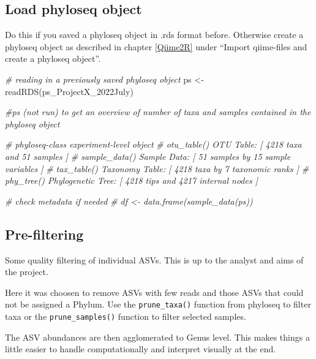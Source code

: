 \documentclass[
]{book}
\newenvironment{Shaded}{\begin{snugshade}}{\end{snugshade}}
\newcommand{\CommentTok}[1]{\textcolor[rgb]{0.56,0.35,0.01}{\textit{#1}}}
\newcommand{\FunctionTok}[1]{\textcolor[rgb]{0.00,0.00,0.00}{#1}}
\newcommand{\NormalTok}[1]{#1}
\newcommand{\OtherTok}[1]{\textcolor[rgb]{0.56,0.35,0.01}{#1}}
\newcommand{\StringTok}[1]{\textcolor[rgb]{0.31,0.60,0.02}{#1}}
\begin{document}
\hypertarget{load-phyloseq-object-2}{%
\subsection{Load phyloseq object}\label{load-phyloseq-object-2}}

Do this if you saved a phyloseq object in .rds format before. Otherwise create a phyloseq object as described in chapter \ref{Qiime2R} under ``Import qiime-files and create a phyloseq object''.

\begin{Shaded}
\begin{Highlighting}[]
\CommentTok{\# reading in a previously saved phyloseq object}
\NormalTok{ps }\OtherTok{\textless{}{-}} \FunctionTok{readRDS}\NormalTok{(}\StringTok{\textquotesingle{}ps\_ProjectX\_2022July\textquotesingle{}}\NormalTok{)}

\CommentTok{\#ps (not run) to get an overview of number of taxa and samples contained in the phyloseq object}

\CommentTok{\# phyloseq{-}class experiment{-}level object}
\CommentTok{\# otu\_table()   OTU Table:         [ 4218 taxa and 51 samples ]}
\CommentTok{\# sample\_data() Sample Data:       [ 51 samples by 15 sample variables ]}
\CommentTok{\# tax\_table()   Taxonomy Table:    [ 4218 taxa by 7 taxonomic ranks ]}
\CommentTok{\# phy\_tree()    Phylogenetic Tree: [ 4218 tips and 4217 internal nodes ]}

\CommentTok{\# check metadata if needed}
\CommentTok{\# df \textless{}{-} data.frame(sample\_data(ps))}
\end{Highlighting}
\end{Shaded}

\hypertarget{pre-filtering-1}{%
\subsection{Pre-filtering}\label{pre-filtering-1}}

Some quality filtering of individual ASVs. This is up to the analyst and aims of the project.

Here it was choosen to remove ASVs with few reads and those ASVs that could not be assigned a Phylum. Use the \texttt{prune\_taxa()} function from phyloseq to filter taxa or the \texttt{prune\_samples()} function to filter selected samples.

The ASV abundances are then agglomerated to Genus level. This makes things a little easier to handle computationally and interpret visually at the end.
\end{document}
